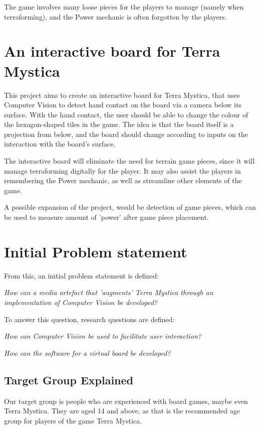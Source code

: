 The game involves many loose pieces for the players to manage (namely when terraforming), and the Power mechanic is often forgotten by the players.

\section{An interactive board for Terra Mystica}
This project aims to create an interactive board for Terra Mystica, that uses Computer Vision to detect hand contact on the board via a camera below its surface. With the hand contact, the user should be able to change the colour of the hexagon-shaped tiles in the game. The idea is that the board itself is a projection from below, and the board should change according to inputs on the interaction with the board's surface.

The interactive board will eliminate the need for terrain game pieces, since it will manage terraforming digitally for the player. It may also assist the players in remembering the Power mechanic, as well as streamline other elements of the game.

A possible expansion of the project, would be detection of game pieces, which can be used to measure amount of 'power' after game piece placement. 

\section{Initial Problem statement}
From this, an initial problem statement is defined: 

\textit{How can a media artefact that 'augments' Terra Mystica through an implementation of Computer Vision be developed?}

To answer this question, research questions are defined:

\textit{How can Computer Vision be used to facilitate user interaction?}

\textit{How can the software for a virtual board be developed?}

\subsection{Target Group Explained}
 Our target group is people who are experienced with board games, maybe even Terra Mystica. They are aged 14 and above, as that is the recommended age group for players of the game Terra Mystica.